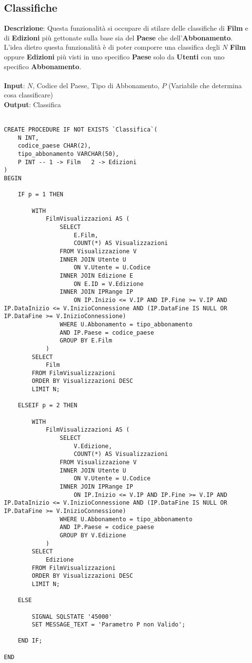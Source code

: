 \documentclass{article}
\begin{document}
\subsection{Classifiche}
\textbf{Descrizione}: Questa funzionalità si occupare di stilare delle classifiche di \textbf{Film} e di \textbf{Edizioni} più gettonate sulla base sia del \textbf{Paese} che dell'\textbf{Abbonamento}. L'idea dietro questa funzionalità è di poter comporre una classifica degli $N$ \textbf{Film} oppure \textbf{Edizioni} più visti in uno specifico \textbf{Paese} solo da \textbf{Utenti} con uno specifico \textbf{Abbonamento}. \\ \\
\textbf{Input}: $N$, Codice del Paese, Tipo di Abbonamento, $P$ (Variabile che determina cosa classificare) \\
\textbf{Output}: Classifica \\ \\
\begin{lstlisting}
CREATE PROCEDURE IF NOT EXISTS `Classifica`(
    N INT,
    codice_paese CHAR(2),
    tipo_abbonamento VARCHAR(50),
    P INT -- 1 -> Film   2 -> Edizioni
)
BEGIN

    IF p = 1 THEN

        WITH
            FilmVisualizzazioni AS (
                SELECT
                    E.Film,
                    COUNT(*) AS Visualizzazioni
                FROM Visualizzazione V
                INNER JOIN Utente U
                    ON V.Utente = U.Codice
                INNER JOIN Edizione E
                    ON E.ID = V.Edizione
                INNER JOIN IPRange IP
                    ON IP.Inizio <= V.IP AND IP.Fine >= V.IP AND IP.DataInizio <= V.InizioConnessione AND (IP.DataFine IS NULL OR IP.DataFine >= V.InizioConnessione)
                WHERE U.Abbonamento = tipo_abbonamento
                AND IP.Paese = codice_paese
                GROUP BY E.Film
            )
        SELECT
            Film
        FROM FilmVisualizzazioni
        ORDER BY Visualizzazioni DESC
        LIMIT N;

    ELSEIF p = 2 THEN

        WITH
            FilmVisualizzazioni AS (
                SELECT
                    V.Edizione,
                    COUNT(*) AS Visualizzazioni
                FROM Visualizzazione V
                INNER JOIN Utente U
                    ON V.Utente = U.Codice
                INNER JOIN IPRange IP
                    ON IP.Inizio <= V.IP AND IP.Fine >= V.IP AND IP.DataInizio <= V.InizioConnessione AND (IP.DataFine IS NULL OR IP.DataFine >= V.InizioConnessione)
                WHERE U.Abbonamento = tipo_abbonamento
                AND IP.Paese = codice_paese
                GROUP BY V.Edizione
            )
        SELECT
            Edizione
        FROM FilmVisualizzazioni
        ORDER BY Visualizzazioni DESC
        LIMIT N;

    ELSE

        SIGNAL SQLSTATE '45000'
        SET MESSAGE_TEXT = 'Parametro P non Valido';

    END IF;

END
\end{lstlisting}
\end{document}

